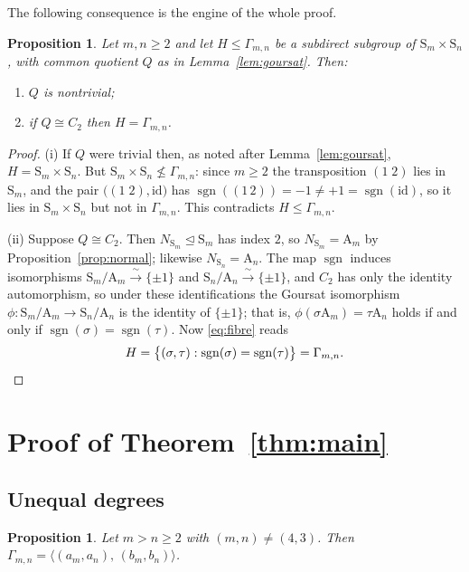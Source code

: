 \documentclass[11pt]{article}
\theoremstyle{plain}
\newtheorem{proposition}[theorem]{Proposition}
\theoremstyle{definition}
\theoremstyle{remark}
\numberwithin{equation}{section}
\newcommand{\Sym}{\mathrm{S}}
\newcommand{\Alt}{\mathrm{A}}
\newcommand{\Gam}{\Gamma}
\DeclareMathOperator{\sgn}{sgn}
\newcommand{\normal}{\trianglelefteq}
\begin{document}
The following consequence is the engine of the whole proof.

\begin{proposition}
\label{prop:key}
Let $m,n \ge 2$ and let $H \le \Gam_{m,n}$ be a subdirect subgroup of $\Sym_m \times \Sym_n$,
with common quotient $Q$ as in Lemma~\ref{lem:goursat}. Then:
\begin{enumerate}
\item $Q$ is nontrivial;
\item if $Q \cong C_2$ then $H = \Gam_{m,n}$.
\end{enumerate}
\end{proposition}

\begin{proof}
(i) If $Q$ were trivial then, as noted after Lemma~\ref{lem:goursat}, $H = \Sym_m \times \Sym_n$.
But $\Sym_m\times\Sym_n \not\le \Gam_{m,n}$: since $m \ge 2$ the transposition $(1\;2)$ lies in
$\Sym_m$, and the pair $\bigl((1\;2), \mathrm{id}\bigr)$ has
$\sgn((1\,2)) = -1 \ne +1 = \sgn(\mathrm{id})$, so it lies in $\Sym_m\times\Sym_n$ but not in
$\Gam_{m,n}$. This contradicts $H \le \Gam_{m,n}$.

(ii) Suppose $Q \cong C_2$. Then $N_{\Sym_m} \normal \Sym_m$ has index $2$, so
$N_{\Sym_m} = \Alt_m$ by Proposition~\ref{prop:normal}; likewise $N_{\Sym_n} = \Alt_n$. The map
$\sgn$ induces isomorphisms $\Sym_m/\Alt_m \xrightarrow{\ \sim\ } \{\pm1\}$ and
$\Sym_n/\Alt_n \xrightarrow{\ \sim\ } \{\pm1\}$, and $C_2$ has only the identity automorphism, so
under these identifications the Goursat isomorphism $\phi : \Sym_m/\Alt_m \to \Sym_n/\Alt_n$ is
the identity of $\{\pm 1\}$; that is, $\phi(\sigma \Alt_m) = \tau\Alt_n$ holds if and only if
$\sgn(\sigma) = \sgn(\tau)$. Now \eqref{eq:fibre} reads
\[
H = \bigl\{(\sigma,\tau) : \sgn(\sigma) = \sgn(\tau)\bigr\} = \Gam_{m,n}. \qedhere
\]
\end{proof}

\section{Proof of Theorem~\ref{thm:main}}
\label{sec:proof}

\subsection{Unequal degrees}

\begin{proposition}
\label{prop:unequal}
Let $m > n \ge 2$ with $(m,n) \ne (4,3)$. Then
$\Gam_{m,n} = \bigl\langle (a_m,a_n),\,(b_m,b_n) \bigr\rangle$.
\end{proposition}
\end{document}
